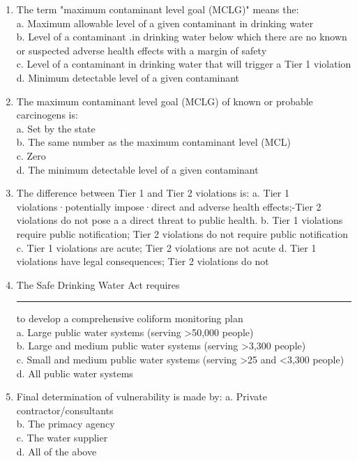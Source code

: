 \documentclass{article}
\begin{document}
\begin{enumerate}
\item The term "maximum contaminant level goal (MCLG)" means the:\\ 
a. Maximum allowable level of a given contaminant in drinking water\\
b. Level of a contaminant .in drinking water below which there are no known or suspected adverse health effects with a margin of safety\\
c. Level of a contaminant in drinking water that will trigger a Tier 1 violation\\
d. Minimum detectable level of a given contaminant\\

\item The maximum contaminant level goal (MCLG) of known or probable carcinogens is:\\
a. Set by the state\\
b. The same number as the maximum contaminant level (MCL)\\
c. Zero\\
d. The minimum detectable level of a given contaminant\\

\item The difference between Tier 1 and Tier 2 violations is:
a. Tier 1 violations·potentially impose·direct and adverse health effects;-Tier 2 violations do not pose a a direct threat to public health.
b. Tier 1 violations require public notification; Tier 2 violations do not require public notification
c. Tier 1 violations are acute; Tier 2 violations are not acute
d. Tier 1 violations have legal consequences; Tier 2 violations do not

\item The Safe Drinking Water Act requires \rule{2cm}{0.3pt} to develop a comprehensive coliform monitoring plan\\
a. Large public water systems (serving >50,000 people)\\
b. Large and medium public water systems (serving >3,300 people)\\
c. Small and medium public water systems (serving >25 and <3,300 people)\\
d. All public water systems\\

\item Final determination of vulnerability is made by:
a. Private contractor/consultants\\
b. The primacy agency\\
c. The water supplier\\
d. All of the above


\end{enumerate}
\end{document}
